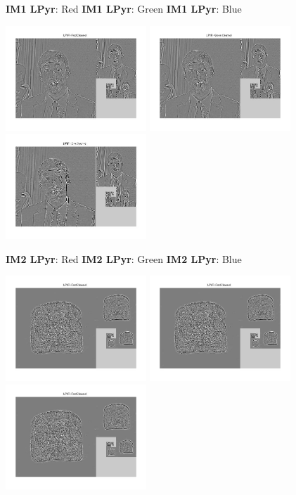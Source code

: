 \documentclass[12pt,twoside]{article}
\newcommand{\tabUnit}{3ex}
\newcommand{\tabT}{\hspace*{\tabUnit}}
\begin{document}
\tabT\tabT\textbf{IM1 LPyr}: Red
\tabT\tabT\tabT\tabT \textbf{IM1 LPyr}: Green
\tabT\tabT\tabT\tabT \textbf{IM1 LPyr}: Blue

\includegraphics[width = 150pt]{andremo_lpyr_r}
\includegraphics[width = 150pt]{andremo_lpyr_g}
\includegraphics[width = 150pt]{andremo_lpyr_b}

\tabT\tabT \textbf{IM2 LPyr}: Red
\tabT\tabT\tabT\tabT \textbf{IM2 LPyr}: Green
\tabT\tabT\tabT\tabT \textbf{IM2 LPyr}: Blue

\includegraphics[width = 150pt]{toast_lpyr_r}
\includegraphics[width = 150pt]{toast_lpyr_r}
\includegraphics[width = 150pt]{toast_lpyr_r}
\end{document}
